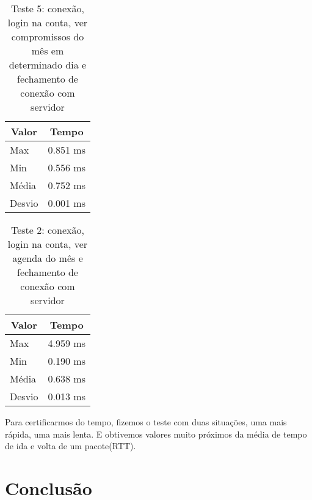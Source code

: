 \documentclass[10pt,a4paper]{article}
\begin{document}
\begin{table}[h!]
\caption{Teste 5: conexão, login na conta, ver compromissos do mês em
  determinado dia e fechamento de conexão com servidor}
\begin{center}
  \begin{tabular}{lr}
    \multicolumn{1}{c}{Valor} & \multicolumn{1}{c}{Tempo}\\
    \hline
    Max & 0.851 ms\\
    Min & 0.556 ms\\
    Média & 0.752 ms \\
    Desvio & 0.001 ms
  \end{tabular}

\end{center}
\end{table}



\begin{table}[h!]
\caption{Teste 2: conexão, login na conta, ver agenda do mês e fechamento de conexão com servidor}
\begin{center}
  \begin{tabular}{lr}
    \multicolumn{1}{c}{Valor} & \multicolumn{1}{c}{Tempo}\\
    \hline
    Max & 4.959 ms\\
    Min & 0.190 ms\\
    Média & 0.638 ms \\
    Desvio & 0.013 ms
  \end{tabular}

\end{center}
\end{table}


Para certificarmos do tempo, fizemos o teste com
duas situações, uma mais rápida, uma mais lenta. E obtivemos valores
muito próximos da média de tempo de ida e volta de um pacote(RTT). 

\section{Conclusão}


\begin{small}
  
\end{small}
\end{document}
